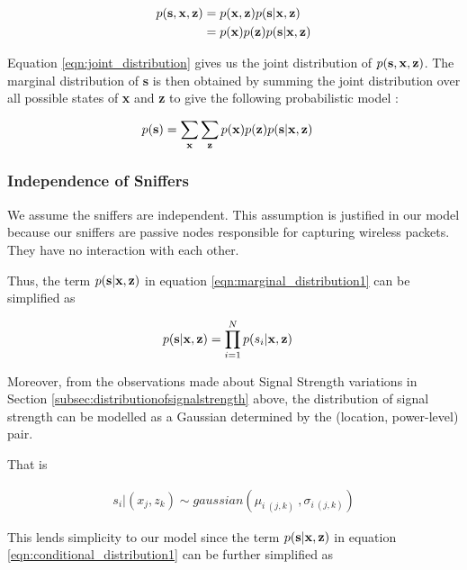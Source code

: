 \documentclass{Localization-PaperWriteupDraft}
\begin{document}
\begin{align}
p( {\bf s}, {\bf x}, {\bf z}) &= p( {\bf x}, {\bf z}) p( {\bf s} | {\bf x}, {\bf z}) \nonumber \\
&= p({\bf x})p({\bf z})p( {\bf s} | {\bf x}, {\bf z}) \label{eqn:joint_distribution}
\end{align}

Equation \ref{eqn:joint_distribution} gives us the joint distribution of $ p( {\bf s}, {\bf x}, {\bf z}) $. The marginal distribution of {\bf s} is then obtained by summing the joint distribution over all possible states of {\bf x} and {\bf z} to give the following probabilistic model :

\begin{align}
p( {\bf s}) & = \sum_{\bf x}\sum_{\bf z} p({\bf x})p({\bf z})p({\bf s}|{\bf x}, {\bf z}) \label{eqn:marginal_distribution1}
\end{align}

\subsubsection{Independence of Sniffers}
\label{subsubsec:independenceofsniffers}

We assume the sniffers are independent. This assumption is justified in our model because our sniffers are passive nodes responsible for capturing wireless packets. They have no interaction with each other. 

Thus, the term $p( {\bf s} | {\bf x}, {\bf z})$ in equation
\ref{eqn:marginal_distribution1} can be simplified as

\begin{align}
p( {\bf s} | {\bf x}, {\bf z}) & = \prod_{i=1}^N p({s_{i}}|{\bf x}, {\bf
		z}) \label{eqn:conditional_distribution1}
\end{align}

Moreover, from the observations made about Signal Strength variations in
Section \ref{subsec:distributionofsignalstrength} above, the distribution of signal strength
can be modelled as a Gaussian determined by the (location, power-level) pair. 

That is 

\begin{align}
s_{i} | ({x_{j}}, {z_{k}})  \sim  gaussian (\mu_{i \ (j,k)} \ , \sigma_{i \ (j,k)})
\end{align}

This lends simplicity to our model since the term $p( {\bf s} | {\bf x}, {\bf z})$ in equation
\ref{eqn:conditional_distribution1} can be further simplified as 
\end{document}
